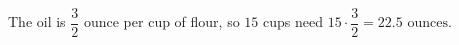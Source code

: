 The oil is $\dfrac{3}{2}$ ounce per cup of flour, so $15$ cups need $15\cdot\dfrac{3}{2}=\boxed{22.5\text{ ounces}}$.
